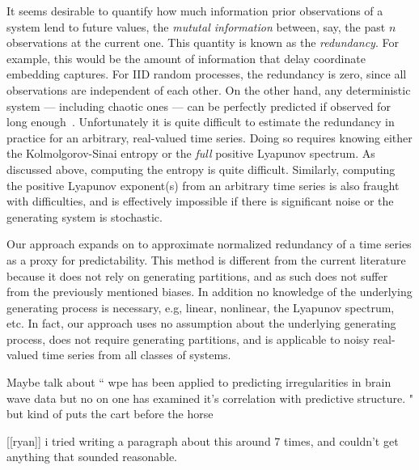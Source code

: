 It seems desirable to quantify how much information prior observations of a system lend to future values, the \emph{mututal information} between, say, the past $n$ observations at the current one. This quantity is known as the \emph{redundancy}. For example, this would be the amount of information that delay coordinate embedding captures. For IID random processes,  the redundancy is zero, since all observations are independent of each other. On the other hand, any deterministic system --- including chaotic ones --- can be perfectly predicted if observed for long enough~\cite{weigend-book}. Unfortunately it is quite difficult to estimate the redundancy in practice for an arbitrary, real-valued time series. Doing so requires knowing either the Kolmolgorov-Sinai entropy or the \emph{full} positive Lyapunov spectrum. As discussed above, computing the entropy is quite difficult. Similarly, computing the positive Lyapunov exponent(s) from an arbitrary time series is also fraught with difficulties, and is effectively impossible if there is significant noise or the generating system is stochastic.

Our approach expands on \cite{bandt2002per} to approximate normalized redundancy of a time series as a proxy for predictability. This method is different from the current literature because it does not rely on generating partitions, and as such does not suffer from the previously mentioned biases. In addition no knowledge of the underlying generating process is necessary, e.g, linear, nonlinear, the Lyapunov spectrum, etc. In fact, our approach uses no assumption about the underlying generating process, does not require generating partitions, and is applicable to noisy real-valued time series from all classes of systems.


{\color{red}
Maybe talk about ``
wpe has been applied to predicting irregularities in brain wave data but no on one has examined it's correlation with predictive structure. "
but kind of puts the cart before the horse

[[ryan]] i tried writing a paragraph about this around 7 times, and couldn't get anything that sounded reasonable.
}

